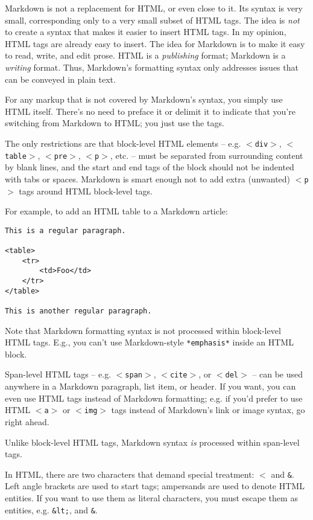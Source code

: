 Markdown is not a replacement for HTML, or even close to it. Its
syntax is very small, corresponding only to a very small subset of
HTML tags. The idea is \emph{not} to create a syntax that makes it easier
to insert HTML tags. In my opinion, HTML tags are already easy to
insert. The idea for Markdown is to make it easy to read, write, and
edit prose. HTML is a \emph{publishing} format; Markdown is a \emph{writing}
format. Thus, Markdown's formatting syntax only addresses issues that
can be conveyed in plain text.

For any markup that is not covered by Markdown's syntax, you simply
use HTML itself. There's no need to preface it or delimit it to
indicate that you're switching from Markdown to HTML; you just use
the tags.

The only restrictions are that block-level HTML elements -- e.g. \texttt{$<$div$>$},
\texttt{$<$table$>$}, \texttt{$<$pre$>$}, \texttt{$<$p$>$}, etc. -- must be separated from surrounding
content by blank lines, and the start and end tags of the block should
not be indented with tabs or spaces. Markdown is smart enough not
to add extra (unwanted) \texttt{$<$p$>$} tags around HTML block-level tags.

For example, to add an HTML table to a Markdown article:

\begin{verbatim}
This is a regular paragraph.

<table>
    <tr>
        <td>Foo</td>
    </tr>
</table>

This is another regular paragraph.
\end{verbatim}

Note that Markdown formatting syntax is not processed within block-level
HTML tags. E.g., you can't use Markdown-style \texttt{*emphasis*} inside an
HTML block.

Span-level HTML tags -- e.g. \texttt{$<$span$>$}, \texttt{$<$cite$>$}, or \texttt{$<$del$>$} -- can be
used anywhere in a Markdown paragraph, list item, or header. If you
want, you can even use HTML tags instead of Markdown formatting; e.g. if
you'd prefer to use HTML \texttt{$<$a$>$} or \texttt{$<$img$>$} tags instead of Markdown's
link or image syntax, go right ahead.

Unlike block-level HTML tags, Markdown syntax \emph{is} processed within
span-level tags.

In HTML, there are two characters that demand special treatment: \texttt{$<$}
and \texttt{\&}. Left angle brackets are used to start tags; ampersands are
used to denote HTML entities. If you want to use them as literal
characters, you must escape them as entities, e.g. \texttt{\&lt;}, and
\texttt{\&}.

